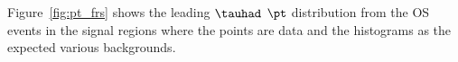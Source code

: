 
Figure~\ref{fig:pt_frs} shows the leading $\tauhad$ $\pt$ distribution from the OS events in the signal regions where the points are data
and the histograms as the expected various backgrounds.

